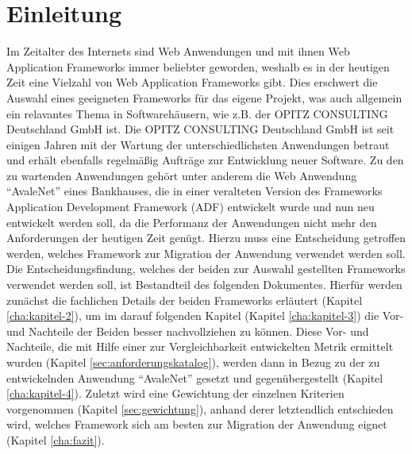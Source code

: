 \section{Einleitung}
Im Zeitalter des Internets sind Web Anwendungen und mit ihnen Web Application Frameworks immer beliebter geworden, weshalb es in der heutigen Zeit eine Vielzahl von Web Application Frameworks gibt. Dies erschwert die Auswahl eines geeigneten Frameworks für das eigene Projekt, was auch allgemein ein relavantes Thema in Softwarehäusern, wie z.B. der OPITZ CONSULTING Deutschland GmbH ist. Die OPITZ CONSULTING Deutschland GmbH ist seit einigen Jahren mit der Wartung der unterschiedlichsten Anwendungen betraut und erhält ebenfalls regelmäßig Aufträge zur Entwicklung neuer Software. Zu den zu wartenden Anwendungen gehört unter anderem die Web Anwendung "`AvaleNet"' eines Bankhauses, die in einer veralteten Version des Frameworks Application Development Framework (ADF) entwickelt wurde und nun neu entwickelt werden soll, da die Performanz der Anwendungen nicht mehr den Anforderungen der heutigen Zeit genügt. Hierzu muss eine Entscheidung getroffen werden, welches Framework zur Migration der Anwendung verwendet werden soll. Die Entscheidungsfindung, welches der beiden zur Auswahl gestellten Frameworks verwendet werden soll, ist Bestandteil des folgenden Dokumentes. Hierfür werden zunächst die fachlichen Details der beiden Frameworks erläutert (Kapitel \ref{cha:kapitel-2}), um im darauf folgenden Kapitel (Kapitel \ref{cha:kapitel-3}) die Vor- und Nachteile der Beiden besser nachvollziehen zu können. Diese Vor- und Nachteile, die mit Hilfe einer zur Vergleichbarkeit entwickelten Metrik ermittelt wurden (Kapitel \ref{sec:anforderungskatalog}), werden dann in Bezug zu der zu entwickelnden Anwendung "`AvaleNet"' gesetzt und gegenübergestellt (Kapitel \ref{cha:kapitel-4}). Zuletzt wird eine Gewichtung der einzelnen Kriterien vorgenommen (Kapitel \ref{sec:gewichtung}), anhand derer letztendlich entschieden wird, welches Framework sich am besten zur Migration der Anwendung eignet (Kapitel \ref{cha:fazit}).